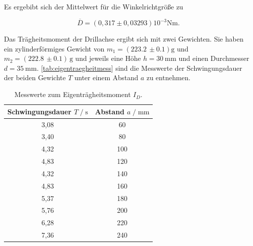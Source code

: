 Es ergebibt sich der Mittelwert für die Winkelrichtgröße zu

\begin{equation}
  \overline D = (0,317\pm 0,03293) 10^{-3}\si{\newton\meter}.
\end{equation}


Das Trägheitsmoment der Drillachse ergibt sich mit zwei Gewichten.
Sie haben ein zylinderförmiges Gewicht von $m_1 = (223.2 \,\pm 0.1) \text{g}$ und $m_2 = (222.8 \,\pm 0.1)\, \text{g}$ und jeweils eine
Höhe $h=\SI{30}{\milli\meter}$ und einen Durchmesser $d=\SI{35}{\milli\meter}$.
\autoref{tab:eigentraegheitmess} sind die Messwerte der Schwingungsdauer der beiden Gewichte $T$ unter einem Abstand $a$ zu entnehmen.

\begin{table}[H]
  \centering
   \caption{Messwerte zum Eigenträgheitsmoment $I_D$.}
   \label{tab:eigentraegheitmess}
   \begin{tabular}{c c}
       \toprule
       Schwingungsdauer $ T \;/\; \si{\second}$ & Abstand $a \;/\; \si{\milli\meter}$ \\
       \midrule
       3,08 & 60 \\
       3,40 & 80 \\
       4,32 & 100 \\
       4,83 & 120 \\
       4,32 & 140 \\
       4,83 & 160 \\
       5,37 & 180 \\
       5,76 & 200 \\
       6,28 & 220 \\
       7,36 & 240 \\
       \bottomrule
   \end{tabular}
\end{table}





